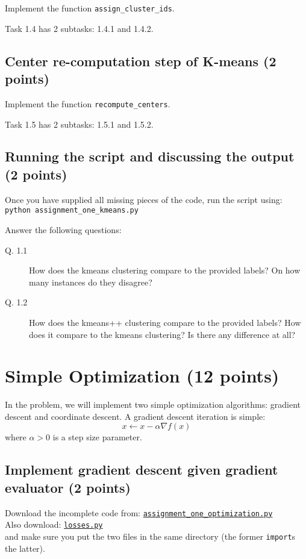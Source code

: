 \documentclass{article}
\begin{document}
Implement the function {\tt assign\_cluster\_ids}.

Task 1.4 has 2 subtasks: 1.4.1 and 1.4.2.

\subsection{Center re-computation step of K-means (2 points)}

Implement the function {\tt recompute\_centers}.

Task 1.5 has 2 subtasks: 1.5.1 and 1.5.2.

\subsection{Running the script and discussing the output (2 points)}

Once you have supplied all missing pieces of the code, run the script using:\\
{\tt python assignment\_one\_kmeans.py}

Answer the following questions:
\begin{description}
\item[Q. 1.1]
How does the kmeans clustering compare to the provided labels? On how many instances do they disagree?
\item[Q. 1.2]
How does the kmeans++ clustering compare to the provided labels? How does it compare to the kmeans clustering? Is there any difference at all?
\end{description}


\section{Simple Optimization (12 points)}

In the problem, we will implement two simple optimization algorithms: gradient descent and coordinate descent. A gradient descent iteration is simple:
\[
x \gets x - \alpha \nabla f(x)
\]
where $\alpha > 0$ is a step size parameter.

\subsection{Implement gradient descent given gradient evaluator (2 points)}

Download the incomplete code from:
\href{https://github.com/ambujtewari/stats607a-fall2014/blob/master/homeworks/assignment_one_optimization.py}{\tt assignment\_one\_optimization.py} \\
Also download:
\href{https://github.com/ambujtewari/stats607a-fall2014/blob/master/homeworks/losses.py}{\tt losses.py} \\
and make sure you put the two files in the same directory (the former {\tt import}s the latter).
\end{document}
